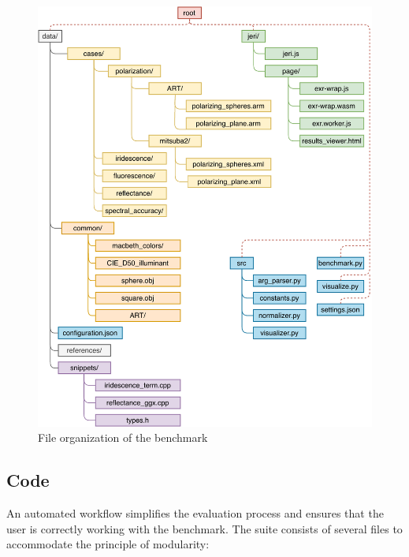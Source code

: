\begin{figure}
	\centering
	\includegraphics[width=\linewidth]{img/framework.pdf}
	\caption{File organization of the benchmark}
	\label{fig:framework}
\end{figure}

\subsection{Code}

An automated workflow simplifies the evaluation process and ensures that the user is correctly working with the benchmark. The suite consists of several files to accommodate the principle of modularity:

